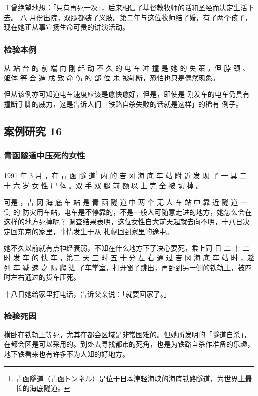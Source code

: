 \documentclass[UTF8]{ctexart}
\begin{document}
Ｔ曾绝望地想：「只有再死一次」，后来相信了基督教牧师的话和圣经而决定生活下去。
八 月份出院，双腿都装了义肢。第二年与这位牧师结了婚，有了两个孩子，现在她正从事宣扬生命可贵的讲演活动。

\subsubsection*{检验本例}

从 站 台 的 前 端 向 刚 起 动 不 久 的 电 车 冲 撞 是 她 的 失 策 ，但 脖 颈 、躯体 等 会 造 成 致 命 伤 的 部 位 未 被轧断，恐怕也只是偶然现象。

但从该例亦可知道电车速度应该是愈快愈好，但是，即使是 刚发车的电车仍具有撞断手脚的威力，这是告诉人们「铁路自杀失败的话就是这样」的稀有 例子。

\subsection{案例研究 16}

\subsubsection*{青函隧道中压死的女性}

1991 年 3 月 ，在 青 函 隧 道\footnote{青函隧道（青函トンネル）是位于日本津轻海峡的海底铁路隧道，为世界上最长的海底隧道。} 内 的 吉 冈 海 底 车 站 附 近 发 现 了 一 具 二 十 六 岁 女 性 尸 体 。双 手 双 腿 前 额 以 上 完 全 被 切 掉 。

可是 ，吉 冈 海 底 车 站 是 青 函 隧 道 中 两 个 无 人 车 站 中 靠 近 隧 道 一 侧 的 防灾用车站，电车是不停靠的，不是一般人可随意走进的地方，她怎么会在这样的地方死掉呢？ 调查结果表明，这位女性自大前天起就去向不明，十八日决定回东京的家里，事情发生于从 札幌回到家里的途中。

她不久以前就有点神经衰弱，不知在什么地方下了决心要死，乘上同 日 二 十 二 时 发 车 的 快 车 ，第二 天 三 时 五 十 分 左 右 通 过 吉 冈 海 底 车 站 时 ，趁 列 车 减 速 之 际 爬 进 了车掌室，打开窗子跳出，再卧到另一侧的铁轨上，被四时左右通过的货车压死。 

十八日她给家里打电话，告诉父亲说：「就要回家了。」

\subsubsection*{检验死因}

横卧在铁轨上等死，尤其在都会区域是非常困难的。但她所发明的「隧道自杀」，在都会区是可以采用的。到处去寻找都市的死角，也是为铁路自杀作准备的乐趣，地下铁看来也有许多不为人知的好地方。
\end{document}
